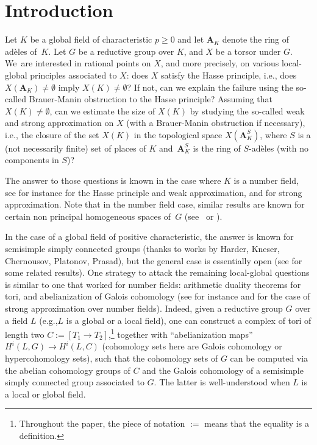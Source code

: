 \documentclass[11pt]{article}
\newcommand{\ie}{i.e.,\xspace}
\newcommand{\eg}{e.g.,\xspace}
\theoremstyle{plain}
\theoremstyle{definition}
\renewcommand\AA{\mathbf{A}}
\begin{document}
\section{Introduction}\label{intro}

Let $K$ be a global field of characteristic $p \geq 0$ and let $\AA_K$ denote the ring of adèles of~$K$. Let $G$ be a reductive group over $K$, and $X$ be a torsor under $G$. We~are interested in rational points on $X$, and more precisely, on various local-global \hbox{principles} associated to $X$: does $X$ satisfy the Hasse principle, \ie does $X(\AA_K) \neq \emptyset$ imply $X(K) \neq \emptyset$? If not, can we explain the failure using the so-called Brauer-Manin obstruc\-tion to the Hasse principle? Assuming that $X(K) \neq \emptyset$, can we estimate the size of $X(K)$ by studying the so-called weak and strong approximation on $X$ (with a Brauer-Manin obstruction if necessary), \ie the closure of the set $X(K)$ in the topological space $X(\AA_K^S)$, where $S$ is a (not necessarily finite) set of places of $K$ and~$\AA_K^S$ is the ring of $S$-adèles (with no components in $S$)?

The answer to those questions is known in the case where $K$ is a number field, see for instance \cite[Cor.\,8.7 \& 8.13]{San} for the Hasse principle and weak approximation, and \cite[Th.\,3.14]{demlms} for strong approximation. Note that in the number field case, similar results are known for certain
non principal
homogeneous spaces of~$G$ (see~\cite{Bor} or \cite{BD}).

In the case of a global field of positive characteristic, the answer is known for semisimple simply connected groups (thanks to works by Harder, Kneser, Chernousov, Platonov, Prasad), but the general case is essentially open (see \cite[Th.\,1.9]{Ros} for some related results). One strategy to attack the remaining local-global questions is similar to one that worked for number fields: arithmetic duality theorems for tori, and abelianization of Galois cohomology (see for instance \cite{demphd} and \cite{demlms} for the case of strong approximation over number fields). Indeed, given a reductive group $G$ over a field $L$ (\eg $L$ is a global or a local field), one can construct a complex of tori of length two $C:= [T_1 \to T_2]$,\footnote{Throughout the paper, the piece of notation $:=$
means that the equality is a definition.}
together with ``abelianization maps'' $H^i(L,G) \to H^i(L,C)$ (cohomology sets here are Galois cohomology or hypercohomology sets), such that the cohomology sets of $G$ can be computed via the abelian cohomology groups of $C$ and the Galois cohomology of a semisimple simply connected group associated to $G$. The latter is well-understood when $L$ is a local or global field.
\end{document}
